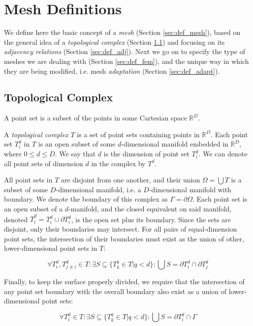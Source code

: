 \section{Mesh Definitions}

We define here the basic concept of a \emph{mesh}
(Section \ref{sec:def_mesh}), based on the general
idea of a \emph{topological complex} (Section \ref{sec:def_complex})
and focusing on its \emph{adjacency relations} (Section \ref{sec:def_adj}).
Next we go on to specify the type of meshes we
are dealing with (Section \ref{sec:def_fem}),
and the unique way in which they are being modified,
i.e. mesh \emph{adaptation} (Section \ref{sec:def_adapt}).

\subsection{Topological Complex}
\label{sec:def_complex}

A point set is a subset of the points in some Cartesian
space $\mathbb{R}^D$.

A \emph{topological complex} $T$ is a set of point sets
containing points in $\mathbb{R}^D$.
Each point set $T^d_i$ in $T$ is an open subset of some
$d$-dimensional manifold embedded in $\mathbb{R}^D$,
where $0\leq d \leq D$.
We say that $d$ is the dimension of point set $T^d_i$.
We can denote all point sets of dimension $d$ in the
complex by $T^d$.

All point sets in $T$ are disjoint from one another,
and their union $\Omega = \bigcup T$ is a subset of some $D$-dimensional
manifold, i.e. a $D$-dimensional manifold with boundary.
We denote the boundary of this complex as $\Gamma = \partial\Omega$.
Each point set is an open subset of a $d$-manifold,
and the closed equivalent on said manifold,
denoted $\bar{T}^d_i = T^d_i \cup \partial T^d_i$,
is the open set plus its boundary.
Since the sets are disjoint, only their boundaries may intersect.
For all pairs of equal-dimension point sets, the intersection
of their boundaries must exist as the union of other,
lower-dimensional point sets in $T$:

\[\forall T^d_i,T^d_{j\neq i} \in T: \exists S \subseteq \{T^q_k \in T \big| q < d\}:
\bigcup S = \partial T^d_i \cap \partial T^d_j\]

Finally, to keep the surface properly divided, we require that
the intersection of any point set boundary with the overall
boundary also exist as a union of lower-dimensional point sets:

\[\forall T^d_i \in T: \exists S \subseteq \{T^q_k \in T \big| q < d\}:
\bigcup S = \partial T^d_i \cap \Gamma\]

